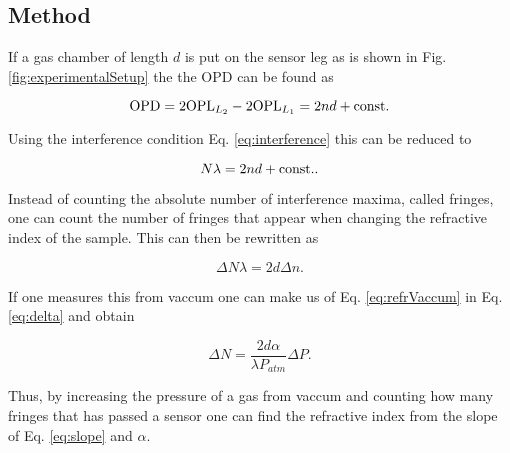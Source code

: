 \subsection{Method}

If a gas chamber of length $d$ is put on the sensor leg as is shown in Fig. \ref{fig:experimentalSetup} the the OPD can be found as

\begin{equation}
  \label{eq:OPD}
  \textnormal{OPD} = 2\textnormal{OPL}_{L_2} - 2\textnormal{OPL}_{L_1} = 2nd + \textnormal{const.}
\end{equation}

Using the interference condition Eq. \eqref{eq:interference} this can be reduced to

\begin{equation*}
  N \lambda = 2nd + \textnormal{const.}.
\end{equation*}

Instead of counting the absolute number of interference maxima, called fringes, one can count the number of fringes that appear when changing the refractive index of the sample. This can then be rewritten as

\begin{equation}
\label{eq:delta}
  \Delta N \lambda = 2d \Delta n.
\end{equation}

If one measures this from vaccum one can make us of Eq. \eqref{eq:refrVaccum} in Eq. \eqref{eq:delta} and obtain

\begin{equation}
\label{eq:slope}
  \Delta N = \frac{2d\alpha}{\lambda P_{atm}} \Delta P.
\end{equation}

Thus, by increasing the pressure of a gas from vaccum and counting how many fringes that has passed a sensor one can find the refractive index from the slope of Eq. \eqref{eq:slope} and $\alpha$.

